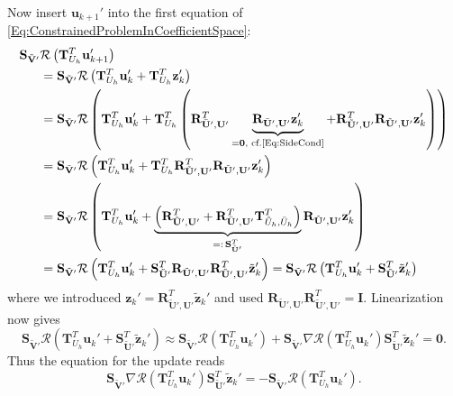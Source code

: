 Now insert  $\mathbf{u}_{k+1}'$ into the first equation of
\eqref{Eq:ConstrainedProblemInCoefficientSpace}:
\begin{equation}
\begin{split}
\mathbf{S}_{\tilde{\mathbf{V}}'}
&\mathcal{R}\left(\mathbf{T}^T_{U_h}\mathbf{u}_{k+1}'\right) \\
&= \mathbf{S}_{\tilde{\mathbf{V}}'}
\mathcal{R}\left(\mathbf{T}^T_{U_h}\mathbf{u}_{k}' +
\mathbf{T}^T_{U_h}\mathbf{z}_{k}' \right)\\
&= \mathbf{S}_{\tilde{\mathbf{V}}'}
\mathcal{R}\left(\mathbf{T}^T_{U_h}\mathbf{u}_{k}' +
\mathbf{T}^T_{U_h} \left(\mathbf{R}^T_{\bar{\mathbf{U}}',\mathbf{U}'}
\underbrace{\mathbf{R}_{\bar{\mathbf{U}}',\mathbf{U}'}
  \mathbf{z}_{k}'}_{=\mathbf{0}, \text{ cf.\eqref{Eq:SideCond}}} +
\mathbf{R}^T_{\tilde{\mathbf{U}}',\mathbf{U}'} 
\mathbf{R}_{\tilde{\mathbf{U}}',\mathbf{U}'} \mathbf{z}_{k}' \right)
\right)\\
&= \mathbf{S}_{\tilde{\mathbf{V}}'}
\mathcal{R}\left(\mathbf{T}^T_{U_h}\mathbf{u}_{k}' +
\mathbf{T}^T_{U_h} \mathbf{R}^T_{\tilde{\mathbf{U}}',\mathbf{U}'} 
\mathbf{R}_{\tilde{\mathbf{U}}',\mathbf{U}'} \mathbf{z}_{k}' \right)\\
&= \mathbf{S}_{\tilde{\mathbf{V}}'}
\mathcal{R}\left(\mathbf{T}^T_{U_h}\mathbf{u}_{k}' +
\underbrace{\left(\mathbf{R}^T_{\tilde{\mathbf{U}}',\mathbf{U}'} +
\mathbf{R}^T_{\bar{\mathbf{U}}',\mathbf{U}'} \mathbf{T}^T_{\tilde{U}_h,\bar{U}_h}
\right)}_{=: \,\mathbf{S}^T_{\tilde{\mathbf{U}}'}}
\mathbf{R}_{\tilde{\mathbf{U}}',\mathbf{U}'} \mathbf{z}_{k}' 
\right) \\
&= 
\mathbf{S}_{\tilde{\mathbf{V}}'}
\mathcal{R}\left(\mathbf{T}^T_{U_h}\mathbf{u}_{k}' + 
\mathbf{S}^T_{\tilde{\mathbf{U}}'}
\mathbf{R}_{\tilde{\mathbf{U}}',\mathbf{U}'}
\mathbf{R}^T_{\tilde{\mathbf{U}}',\mathbf{U}'} \tilde{\mathbf{z}}_{k}'
\right)
=
\mathbf{S}_{\tilde{\mathbf{V}}'}
\mathcal{R}\left(\mathbf{T}^T_{U_h}\mathbf{u}_{k}' + 
\mathbf{S}^T_{\tilde{\mathbf{U}}'} \tilde{\mathbf{z}}_{k}'\right)
\end{split}
\end{equation}
where we introduced $\mathbf{z}_{k}' =
\mathbf{R}^T_{\tilde{\mathbf{U}}',\mathbf{U}'}
\tilde{\mathbf{z}}_{k}'$ and used $\mathbf{R}_{\tilde{\mathbf{U}}',\mathbf{U}'}
\mathbf{R}^T_{\tilde{\mathbf{U}}',\mathbf{U}'}=\mathbf{I}$. 
Linearization now gives
\begin{equation}
\mathbf{S}_{\tilde{\mathbf{V}}'}
\mathcal{R}\left(\mathbf{T}^T_{U_h}\mathbf{u}_{k}' + 
\mathbf{S}^T_{\tilde{\mathbf{U}}'} \tilde{\mathbf{z}}_{k}'\right)
\approx \mathbf{S}_{\tilde{\mathbf{V}}'}
\mathcal{R}\left(\mathbf{T}^T_{U_h}\mathbf{u}_{k}'\right) 
+ \mathbf{S}_{\tilde{\mathbf{V}}'} \nabla
\mathcal{R}\left(\mathbf{T}^T_{U_h}\mathbf{u}_{k}'\right)
\mathbf{S}^T_{\tilde{\mathbf{U}}'} \tilde{\mathbf{z}}_{k}' = \mathbf{0}.
\end{equation}
Thus the equation for the update reads
\begin{equation}
\mathbf{S}_{\tilde{\mathbf{V}}'} \nabla
\mathcal{R}\left(\mathbf{T}^T_{U_h}\mathbf{u}_{k}'\right)
\mathbf{S}^T_{\tilde{\mathbf{U}}'} \tilde{\mathbf{z}}_{k}'
= - \mathbf{S}_{\tilde{\mathbf{V}}'}
\mathcal{R}\left(\mathbf{T}^T_{U_h}\mathbf{u}_{k}'\right) .
\end{equation}

